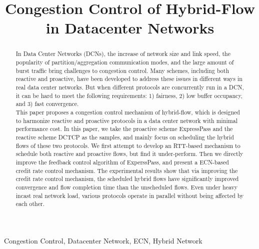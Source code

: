 \documentclass[conference]{IEEEtran}
\begin{document}
\title{Congestion Control of Hybrid-Flow in Datacenter Networks\\
}

\author{

}

\maketitle

\begin{abstract}

In Data Center Networks (DCNs), the increase of network size and link speed, the popularity of partition/aggregation communication modes, and the large amount of burst traffic bring challenges to congestion control. Many schemes, including both reactive and proactive, have been developed to address these issues in different ways in real data center networks. But when different protocols are concurrently run in a DCN, it can be hard to meet the following requirements: 1) fairness, 2) low buffer occupancy, and 3) fast convergence.\\

This paper proposes a congestion control mechanism of hybrid-flow, which is designed to harmonize reactive and proactive protocols in a data center network with minimal performance cost. In this paper, we take the proactive scheme ExpressPass and the reactive scheme DCTCP as the samples, and mainly focus on scheduling the hybrid flows of these two protocols. We first attempt to develop an RTT-based mechanism to schedule both reactive and proactive flows, but find it under-perform. Then we directly improve the feedback control algorithm of ExperssPass, and present a ECN-based credit rate control mechanism. The experimental results show that via improving the credit rate control mechanism, the scheduled hybrid flows have significantly improved convergence and flow completion time than the unscheduled flows. Even under heavy incast real network load, various protocols operate in parallel without being affected by each other.

\end{abstract}

\begin{IEEEkeywords}
Congestion Control, Datacenter Network, ECN, Hybrid Network
\end{IEEEkeywords}
\end{document}
